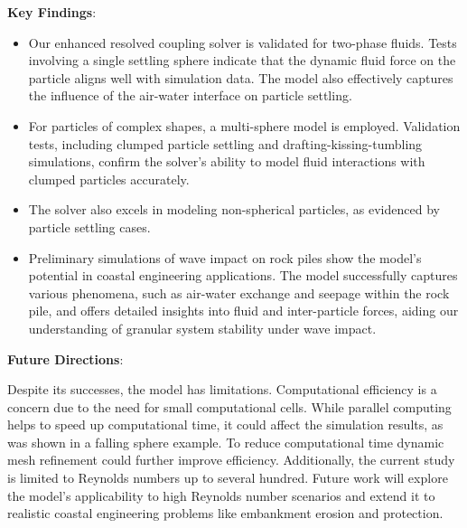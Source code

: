 \textbf{Key Findings}:
\begin{itemize}
    \item Our enhanced resolved coupling solver is validated for two-phase fluids. Tests involving a single settling sphere indicate that the dynamic fluid force on the particle aligns well with simulation data. The model also effectively captures the influence of the air-water interface on particle settling.
\item For particles of complex shapes, a multi-sphere model is employed. Validation tests, including clumped particle settling and drafting-kissing-tumbling simulations, confirm the solver's ability to model fluid interactions with clumped particles accurately.
\item The solver also excels in modeling non-spherical particles, as evidenced by particle settling cases.

\item Preliminary simulations of wave impact on rock piles show the model's potential in coastal engineering applications. The model successfully captures various phenomena, such as air-water exchange and seepage within the rock pile, and offers detailed insights into fluid and inter-particle forces, aiding our understanding of granular system stability under wave impact.
\end{itemize}

\textbf{Future Directions}:

Despite its successes, the model has limitations. Computational efficiency is a concern due to the need for small computational cells. While parallel computing helps to speed up computational time, it could affect the simulation results, as was shown in a falling sphere example. To reduce computational time dynamic mesh refinement could further improve efficiency. Additionally, the current study is limited to Reynolds numbers up to several hundred. Future work will explore the model's applicability to high Reynolds number scenarios and extend it to realistic coastal engineering problems like embankment erosion and protection.